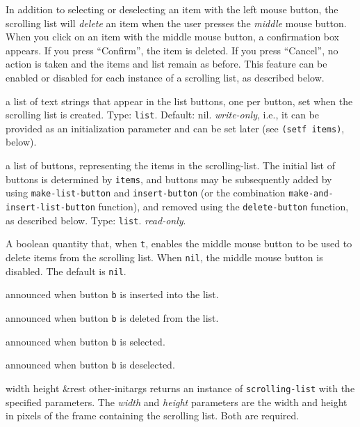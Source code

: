 \documentclass[twoside,openright,11pt]{report}
\newcommand{\tp}[1]{\texttt{#1}}
\begin{document}
In addition to selecting or deselecting an item with the left mouse
button, the scrolling list will \emph{delete} an item when the user
presses the \emph{middle} mouse button.  When you click on an item
with the middle mouse button, a confirmation box appears.  If you
press ``Confirm'', the item is deleted.  If you press ``Cancel'', no
action is taken and the items and list remain as before.  This feature
can be enabled or disabled for each instance of a scrolling list, as
described below.


{a list of text strings that appear in the list buttons, one per
button, set when the scrolling list is created.  Type: \tp{list}.
Default: nil.  \textit{write-only}, i.e., it can be provided as an
initialization parameter and can be set later (see \tp{(setf items)},
below).}

{a list of buttons, representing the items in the scrolling-list.  The
initial list of buttons is determined by \tp{items}, and buttons
may be subsequently added by using \tp{make-list-button} and
\tp{insert-button} (or the combination
\tp{make-and-insert-list-button} function), and removed using the
\tp{delete-button} function, as described below.  Type:
\tp{list}.  \textit{read-only}.}

{A boolean quantity that, when \tp{t}, enables the middle mouse
button to be used to delete items from the scrolling list.  When
\tp{nil}, the middle mouse button is disabled.  The default is
\tp{nil}.}


{announced when button \tp{b} is inserted into the list.}

{announced when button \tp{b} is deleted from the list.}

{announced when button \tp{b} is selected.}

{announced when button \tp{b} is deselected.}


{width height \&rest other-initargs}
{returns an instance of \tp{scrolling-list} with the specified
parameters.  The \emph{width} and \emph{height} parameters are the
width and height in pixels of the frame containing the scrolling list.
Both are required.}
\end{document}

